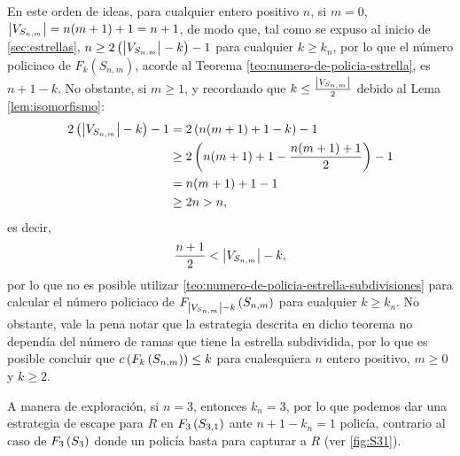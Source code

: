 En este orden de ideas, para cualquier entero positivo $n$, si $m=0$,
$\left|V_{S_{n,m}}\right| = n(m+1) + 1 = n + 1$, de modo que, tal como se expuso al
inicio de \cref{sec:estrellas}, $n\geq 2\left( \left|V_{S_{n,m}}\right| - k\right) - 1$ para
cualquier $k\geq k_n$, por lo que el n\'umero policiaco de $F_k(S_{n,m})$,
acorde al Teorema \ref{teo:numero-de-policia-estrella}, es $n+1-k$. No obstante,
si $m\geq1$, y recordando que $k\leq \frac{\left|V_{S_{n,m}}\right|}{2}$ debido al Lema
\ref{lem:isomorfismo}:
\begin{align*}
    2\left( \left|V_{S_{n,m}}\right| - k\right) - 1 
        &= 2\left( n(m+1) + 1 - k\right) - 1\\
        &\geq 2\left( n(m+1) + 1 - \frac{n(m+1) + 1}{2}\right) -1\\
        &= n(m+1) + 1 -1\\
        &\geq 2n > n,
\end{align*}
es decir,
\[
    \frac{n+1}{2} < \left|V_{S_{n,m}}\right| - k,
\]
por lo que no es posible utilizar
\cref{teo:numero-de-policia-estrella-subdivisiones} para calcular el n\'umero
policiaco de $F_{\left|V_{S_{n,m}}\right|-k}\left( S_{n,m}\right)$ para cualquier $k\geq k_n$. No
obstante, vale la pena notar que la estrategia descrita en dicho teorema no
depend\'ia del n\'umero de ramas que tiene la estrella subdividida, por lo que
es posible concluir que $c\left( F_{k}\left( S_{n,m}\right)\right) \leq k$ para cualesquiera $n$
entero positivo, $m\geq 0$ y $k\geq2$.

A manera de exploraci\'on, si $n=3$, entonces $k_n=3$, por lo que podemos dar
una estrategia de escape para $R$ en $F_{3}\left( S_{3,1}\right)$ ante $n+1-k_n = 1$
polic\'ia, contrario al caso de $F_{3}\left( S_{3}\right)$ donde un polic\'ia basta para
capturar a $R$ (ver \cref{fig:S31}).

